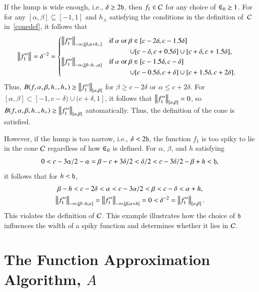 \documentclass[review]{elsarticle}
\theoremstyle{definition}
\begin{document}
If the hump is wide enough, i.e., $\delta \ge 2 \fh$, then $f_1 \in \cc$ for any
choice of $\fC_0 \ge 1$. For for any $[\alpha,\beta]\subseteq [-1,1]$ and
$h_{\pm}$ satisfying the conditions in the definition of~$\cc$ in~\eqref{conedef}, 
it follows that
\begin{align*}
    & \norm{f''_1} = \delta^{-2} =
\begin{cases}
\norm[-\infty,{[\beta,\alpha+h_+]}]{f''_1}  %
   & \text{if } \alpha\text{ or } \beta \in [c - 2\delta,  c - 1.5\delta]  
\\ & \qquad\quad \cup [c - \delta,  c + 0.5\delta] \cup [c + \delta, c+1.5\delta],
\\ \norm[-\infty,{[\beta - h_-,\alpha]}]{f''_1} %
   & \text{if } \alpha\text{ or } \beta \in [c - 1.5\delta,  c - \delta]
\\ & \qquad\quad  \cup [c - 0.5 \delta,  c + \delta] \cup [c + 1.5\delta, c+2\delta].
\end{cases}
\end{align*}
Thus, $B(f,\alpha,\beta,h_-,h_+)\ge\norm[{[\alpha,\beta]}]{f''_1}$ for $\beta
\ge c - 2\delta$ or $\alpha \le c + 2\delta$. For $[\alpha,\beta] \subset [-1,c
- \delta) \cup (c+\delta, 1]$, it follows that $\norm[{[\alpha,\beta]}]{f''_1} =
0$, so $B(f,\alpha,\beta,h_-,h_+)\ge\norm[{[\alpha,\beta]}]{f''_1}$
automatically. Thus, the definition of the cone is satisfied.

However, if the hump is too narrow, i.e., $\delta < 2 \fh$, the function $f_1$
is too spiky to lie in the cone $\cc$ regardless of how $\fC_0$ is defined. For
$\alpha$, $\beta$, and $h$ satisfying
\[
0 < c - 3\alpha/2 -\alpha =  \beta - c+ 3\delta/2 < \delta/2 < c-3\delta/2 - \beta + h < \fh,
\]
it follows that for $h < \fh$,
\begin{gather*}
   \beta -  h < c - 2 \delta < \alpha < c - 3\alpha/2 < \beta < c - \delta < \alpha + h, 
\\ \norm[-\infty,{[\beta - h,\alpha]}]{f''_1} =\norm[-\infty,{[\beta,\alpha+h]}]{f''_1}=0 
< \delta^{-2} =\norm[{[\alpha,\beta]}]{f''_1}.
\end{gather*}
This violates the definition of $\cc$. This example illustrates how the choice
of $\fh$ influences the width of a spiky function and determines whether it lies in
$\cc$.


\section{The Function Approximation Algorithm, $A$}\label{sec:fappx}
\end{document}
